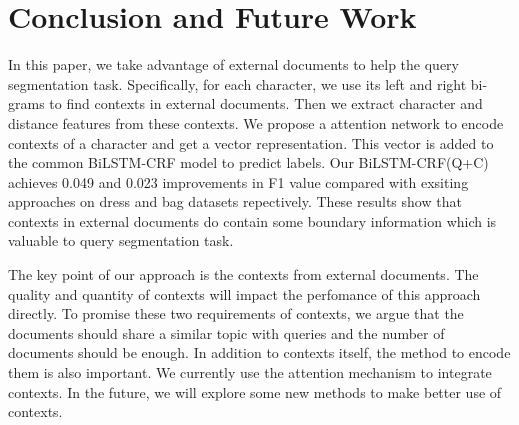 \section{Conclusion and Future Work}
\label{sec:conclusion}

In this paper, we take advantage of external documents to help the query segmentation task. Specifically, for each character, we use its left and right bi-grams to find contexts in external documents. Then we extract character and distance features from these contexts. We propose a attention network to encode contexts of a character and get a vector representation. This vector is added to the common BiLSTM-CRF model to predict labels. Our BiLSTM-CRF(Q+C) achieves 0.049 and 0.023 improvements in F1 value compared with exsiting approaches on dress and bag datasets repectively. These results show that contexts in external documents do contain some boundary information which is valuable to query segmentation task.

The key point of our approach is the contexts from external documents. The quality and quantity of contexts will impact the perfomance of this approach directly. To promise these two requirements of contexts, we argue that the documents should share a similar topic with queries and the number of documents should be enough. In addition to contexts itself, the method to encode them is also important. We currently use the attention mechanism to integrate contexts. In the future, we will explore some new methods to make better use of contexts.
